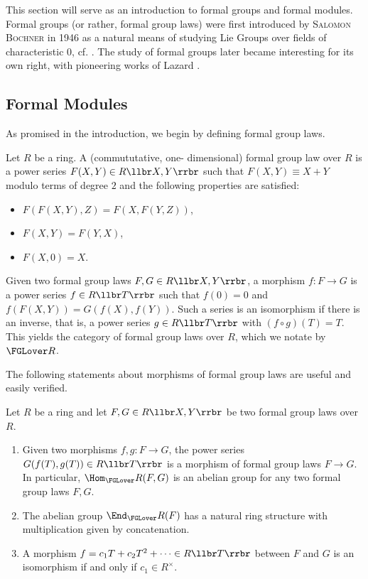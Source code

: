 This section will serve as an introduction to formal groups and 
formal modules. Formal groups (or rather, formal group laws) were first
introduced by \textsc{Salomon Bochner} in 1946 as a natural means of studying Lie
Groups over fields of characteristic $0$, cf. \cite{Bochner1946FGrps}. 
The study of formal groups later became interesting for its own right, 
with pioneering works of Lazard \cite{Lazard1955FGrps}.

\subsection{Formal Modules} %
\label{sub:Formal Modules}
As promised in the introduction, we begin by defining {formal group
laws}.

\begin{defi}
    Let $R$ be a ring. A (commututative, one-\allowbreak
    dimen\-sional) formal group law over $R$ is a power series $F(X,Y) \in
    R\llbr X, Y \rrbr$ such that $F(X,Y) \equiv X + Y$ modulo terms
    of degree $2$ and
    the following properties are satisfied:
    \begin{itemize}
        \item $F(F(X,Y),Z) = F(X,F(Y,Z))$,
        \item $F(X,Y) = F(Y,X)$,
        \item $F(X,0) = X$.
    \end{itemize}
\end{defi}
Given two formal group laws $F, G \in R\llbr X,Y\rrbr$, a morphism
$f: F\to G$ is a 
power series $f \in R\llbr T \rrbr$ such that $f(0) = 0$ and $f(F(X,Y)) =
G(f(X),f(Y))$.
Such a series is an isomorphism if there is an {inverse}, that
is, a power series $g \in R\llbr T \rrbr$ with $(f \circ g)(T) = T$.
This yields the category of formal group laws over $R$, which we notate by
$\FGLover R$.

The following statements about morphisms of formal group laws are 
useful and easily verified.
\begin{lem}\label{lem:FGLeasyfacts}
  Let $R$ be a ring and let $F,G \in R\llbr X,Y\rrbr$ be two formal
  group laws over $R$. 
  \begin{enumerate}
    \item Given two morphisms $f,g : F \to G$, the power series $G(f(T), g(T))
      \in R\llbr T \rrbr$ is a morphism of formal group laws 
      $F \to G$. In particular, $\Hom_\FGLover R(F,G)$ is an abelian
      group for any two formal group laws $F,G$.
    \item The abelian group $\End_\FGLover R(F)$ has a natural ring structure
      with multiplication given by concatenation.
    \item A morphism $f = c_1 T + c_2 T^2 + \dots \in R\llbr T \rrbr$ between
      $F$ and $G$ is an isomorphism if and only if $c_1 \in R^\times$.
  \end{enumerate}
\end{lem}

